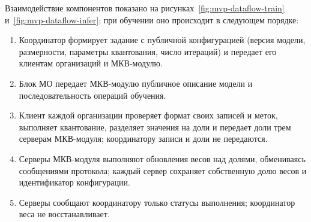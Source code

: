 Взаимодействие компонентов показано на рисунках~\ref{fig:mvp-dataflow-train} и~\ref{fig:mvp-dataflow-infer}; при обучении оно происходит в следующем порядке:
\begin{enumerate}
\item[1.] Координатор формирует задание с публичной конфигурацией (версия модели, размерности, параметры квантования, число итераций) и передает его клиентам организаций и МКВ-модулю.
\item[2.] Блок МО передает МКВ-модулю публичное описание модели и последовательность операций обучения.
\item[3.] Клиент каждой организации проверяет формат своих записей и меток, выполняет квантование, разделяет значения на доли и передает доли трем серверам МКВ-модуля; координатору записи и доли не передаются.
\item[4.] Серверы МКВ-модуля выполняют обновления весов над долями, обмениваясь сообщениями протокола; каждый сервер сохраняет собственную долю весов и идентификатор конфигурации.
\item[5.] Серверы сообщают координатору только статусы выполнения; координатор веса не восстанавливает.
\end{enumerate}

\usetikzlibrary{arrows.meta}


